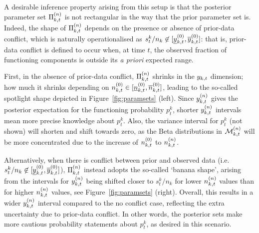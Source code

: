 \documentclass[12pt, a4paper]{elsarticle}
\begin{document}
A desirable inference property arising from this setup is that
the posterior parameter set $\Pi^{(n)}_{k,t}$ is not rectangular in the way that the prior parameter set is.
Indeed, the shape of $\Pi^{(n)}_{k,t}$ depends on the presence or absence of prior-data conflict,
which is naturally operationalised as $s^k_t/n_k \not\in [\underline{y}^{(0)}_{k,t}, \overline{y}^{(0)}_{k,t}]$:
that is, prior-data conflict is defined to occur when, at time $t$, the observed fraction of functioning components
is outside its \emph{a priori} expected range.

First, in the absence of prior-data conflict, 
$\Pi^{(n)}_{k,t}$ shrinks in the $y_{k,t}$ dimension;
how much it shrinks depending on $n^{(0)}_{k,t} \in [\underline{n}^{(0)}_{k,t}, \overline{n}^{(0)}_{k,t}]$,
leading to the so-called spotlight shape depicted in Figure~\ref{fig:paramsets} (left).
Since $y^{(n)}_{k,t}$ gives the posterior expectation for the functioning probability $p_t^k$,
shorter $y^{(n)}_{k,t}$ intervals mean more precise knowledge about $p_t^k$.
Also, the variance interval for $p_t^k$ (not shown) will shorten and shift towards zero,
as the Beta distributions in $\mathcal{M}^{(n)}_{k,t}$ will be more concentrated
due to the increase of $n^{(0)}_{k,t}$ to $n^{(n)}_{k,t}$.

Alternatively, when there is conflict between prior and observed data (i.e.\ $s^k_t/n_k \not\in [\underline{y}^{(0)}_{k,t}, \overline{y}^{(0)}_{k,t}]$),
$\Pi^{(n)}_{k,t}$ instead adopts the so-called `banana shape',
arising from the intervals for $y^{(n)}_{k,t}$  being shifted closer to $s^k_t/n_k$
for lower $n^{(n)}_{k,t}$ values than for higher $n^{(n)}_{k,t}$ values, see Figure~\ref{fig:paramsets} (right).
Overall, this results in a wider $y^{(n)}_{k,t}$ interval compared to the no conflict case, 
reflecting the extra uncertainty due to prior-data conflict.  
In other words, the posterior sets make more cautious probability statements about $p_t^k$, as desired in this scenario.
\end{document}

